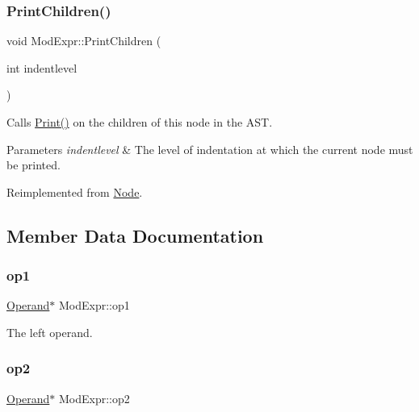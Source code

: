 \mbox{\label{class_mod_expr_a63c59a077d8f2928ea05902533362e02}} 
\subsubsection{\texorpdfstring{Print\+Children()}{PrintChildren()}}
{\footnotesize\ttfamily void Mod\+Expr\+::\+Print\+Children (\begin{DoxyParamCaption}\item[{int}]{indentlevel }\end{DoxyParamCaption})\hspace{0.3cm}{\ttfamily [virtual]}}

Calls \hyperlink{class_node_a9ef727fd72d1a37792b3db60a8a479dd}{Print()} on the children of this node in the A\+ST. 
\begin{DoxyParams}{Parameters}
{\em indentlevel} & The level of indentation at which the current node must be printed. \\
\hline
\end{DoxyParams}


Reimplemented from \hyperlink{class_node_a3e67ec8d22182b721717af14fe0c3000}{Node}.



\subsection{Member Data Documentation}
\mbox{\label{class_mod_expr_a46aa348a8321839cd2b29ea40fc3bb70}} 
\subsubsection{\texorpdfstring{op1}{op1}}
{\footnotesize\ttfamily \hyperlink{class_operand}{Operand}$\ast$ Mod\+Expr\+::op1\hspace{0.3cm}{\ttfamily [protected]}}

The left operand. \mbox{\label{class_mod_expr_a0d2a8a56e2fb1dd1506645aaaa2282cc}} 
\subsubsection{\texorpdfstring{op2}{op2}}
{\footnotesize\ttfamily \hyperlink{class_operand}{Operand}$\ast$ Mod\+Expr\+::op2\hspace{0.3cm}{\ttfamily [protected]}}

